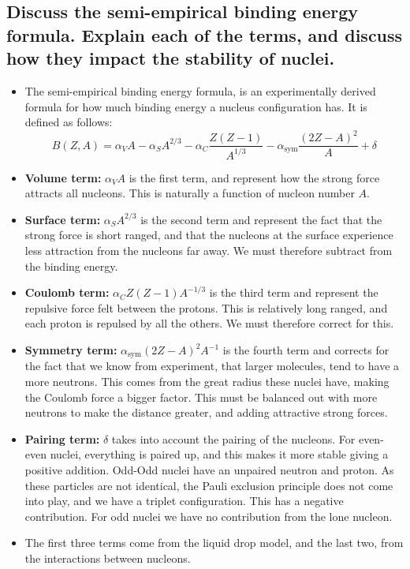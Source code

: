 \documentclass{article}
\begin{document}
\subsection{Discuss the semi-empirical binding energy formula. Explain each of the terms, and discuss how they impact the stability of nuclei.}
\begin{itemize}
    \item The semi-empirical binding energy formula, is an experimentally derived formula for how much binding energy a nucleus configuration has. It is defined as follows:
    \begin{equation}
      B(Z,A) = α_{V} A - α_{S} A^{2/3} - α_{C} \frac{Z(Z-1)}{A^{1/3}} - α_{\text{sym}} \frac{(2Z-A)^2}{A} + δ
    \end{equation} 
    \item \textbf{Volume term:} $α_{V}A$ is the first term, and represent how the strong force attracts all nucleons. This is naturally a function of nucleon number $A$. 
    \item \textbf{Surface term:} $α_{S}A^{2/3}$ is the second term and represent the fact that the strong force is short ranged, and that the nucleons at the surface experience less attraction from the nucleons far away. We must therefore subtract from the binding energy. 
    \item \textbf{Coulomb term:} $α_{C} Z(Z-1)A^{-1/3}$ is the third term and represent the repulsive force felt between the protons. This is relatively long ranged, and each proton is repulsed by all the others. We must therefore correct for this. 
    \item \textbf{Symmetry term:} $α_{\text{sym}}(2Z-A)^2A^{-1}$ is the fourth term and corrects for the fact that we know from experiment, that larger molecules, tend to have a more neutrons. This comes from the great radius these nuclei have, making the Coulomb force a bigger factor. This must be balanced out with more neutrons to make the distance greater, and adding attractive strong forces. 
    \item \textbf{Pairing term:} $δ$ takes into account the pairing of the nucleons. For even-even nuclei, everything is paired up, and this makes it more stable giving a positive addition. Odd-Odd nuclei have an unpaired neutron and proton. As these particles are not identical, the Pauli exclusion principle does not come into play, and we have a triplet configuration. This has a negative contribution. For odd nuclei we have no contribution from the lone nucleon. 
    \item The first three terms come from the liquid drop model, and the last two, from the interactions between nucleons.  
\end{itemize}
\end{document}
